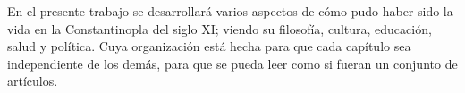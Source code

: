	En el presente trabajo se desarrollará varios aspectos de cómo pudo haber sido la vida en la Constantinopla del siglo XI; viendo su filosofía, cultura, educación, salud y política. Cuya organización está hecha para que cada capítulo sea independiente de los demás, para que se pueda leer como si fueran un conjunto de artículos.
